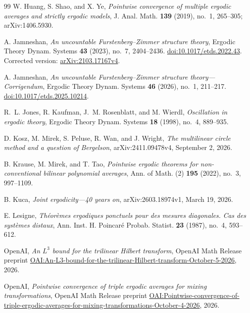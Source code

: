 \begin{thebibliography}{99}
W. Huang, S. Shao, and X. Ye,
\emph{Pointwise convergence of multiple ergodic averages and strictly
ergodic models},
J. Anal. Math. \textbf{139} (2019), no.~1, 265--305;
arXiv:1406.5930.

A. Jamneshan,
\emph{An uncountable Furstenberg--Zimmer structure theory},
Ergodic Theory Dynam. Systems \textbf{43} (2023), no.~7, 2404--2436.
\href{https://doi.org/10.1017/etds.2022.43}{doi:10.1017/etds.2022.43}.
Corrected version: \href{https://arxiv.org/abs/2103.17167v4}{arXiv:2103.17167v4}.

A. Jamneshan,
\emph{An uncountable Furstenberg--Zimmer structure theory---Corrigendum},
Ergodic Theory Dynam. Systems \textbf{46} (2026), no.~1, 211--217.
\href{https://doi.org/10.1017/etds.2025.10214}{doi:10.1017/etds.2025.10214}.

R.~L. Jones, R. Kaufman, J.~M. Rosenblatt, and M. Wierdl,
\emph{Oscillation in ergodic theory},
Ergodic Theory Dynam. Systems \textbf{18} (1998), no.~4, 889--935.

D. Kosz, M. Mirek, S. Peluse, R. Wan, and J. Wright,
\emph{The multilinear circle method and a question of Bergelson},
arXiv:2411.09478v4, September 2, 2026.

B. Krause, M. Mirek, and T. Tao,
\emph{Pointwise ergodic theorems for non-conventional bilinear polynomial
averages},
Ann. of Math. (2) \textbf{195} (2022), no.~3, 997--1109.

B. Kuca,
\emph{Joint ergodicity---40 years on},
arXiv:2603.18974v1, March 19, 2026.

E. Lesigne,
\emph{Th\'eor\`emes ergodiques ponctuels pour des mesures diagonales.
Cas des syst\`emes distaux},
Ann. Inst. H. Poincar\'e Probab. Statist. \textbf{23} (1987), no.~4,
593--612.

OpenAI,
\emph{An $L^3$ bound for the trilinear Hilbert transform},
OpenAI Math Release preprint
\href{https://github.com/openai/math/blob/main/preprints/An-L3-bound-for-the-trilinear-Hilbert-transform-October-5-2026/paper.pdf}{OAI:An-L3-bound-for-the-trilinear-Hilbert-transform-October-5-2026},
2026.

OpenAI,
\emph{Pointwise convergence of triple ergodic averages for mixing
transformations},
OpenAI Math Release preprint
\href{https://github.com/openai/math/blob/main/preprints/Pointwise-convergence-of-triple-ergodic-averages-for-mixing-transformations-October-4-2026/pointwise-triple-ergodic-averages-mixing-transformations.pdf}{OAI:Pointwise-convergence-of-triple-ergodic-averages-for-mixing-transformations-October-4-2026},
2026.


\end{thebibliography}
